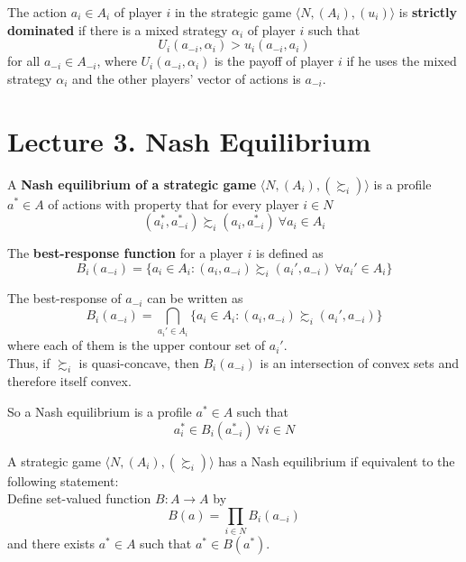 \documentclass[11pt]{article}
\begin{document}
			\begin{definition}[59.2]
				The action $a_i \in A_i$ of player $i$ in the strategic game $\langle N, (A_i), (u_i) \rangle$ is \textbf{strictly dominated} if there is a mixed strategy $\alpha_i$ of player $i$ such that 
				\[
					U_i(a_{-i}, \alpha_i) > u_i(a_{-i}, a_i)
				\]
				for all $a_{-i} \in A_{-i}$, where $U_i(a_{-i}, \alpha_i)$ is the payoff of player $i$ if he uses the mixed strategy $\alpha_i$ and the other players' vector of actions is $a_{-i}$.
			\end{definition}
		
		
	\section{Lecture 3. Nash Equilibrium}
		\begin{definition}[14.1]
			A \textbf{Nash equilibrium of a strategic game} $\langle N, (A_i), (\succsim_i) \rangle$ is a profile $a^* \in A$ of actions with property that for every player $i \in N$
			\[
				(a_i^*, a^*_{-i}) \succsim_i (a_i, a^*_{-i})\ \forall a_i \in A_i
			\]
		\end{definition}
		
		\begin{definition}[pg.15]
			The \textbf{best-response function} for a player $i$ is defined as
			\[
				B_i(a_{-i}) = \{a_i \in A_i : (a_i, a_{-i}) \succsim_i (a_i', a_{-i})\ \forall a_i' \in A_i \}
			\]
		\end{definition}
		
		\begin{remark}
			The best-response of $a_{-i}$ can be written as 
			\[
				B_i(a_{-i}) = \bigcap_{a_i' \in A_i} \{a_i \in A_i : (a_i, a_{-i}) \succsim_i (a_i', a_{-i})\}
			\]
			where each of them is the upper contour set of $a_i'$. \\
			Thus, if $\succsim_i$ is quasi-concave, then $B_i(a_{-i})$ is an intersection of convex sets and therefore itself convex.
		\end{remark}
		
		\begin{remark}[pg.15]
			So a Nash equilibrium is a profile $a^* \in A$ such that
			\[
				a^*_i \in B_i(a^*_{-i})\ \forall i \in N
			\]
		\end{remark}
		
		\begin{lemma}[pg.19]
			A strategic game $\langle N, (A_i), (\succsim_i) \rangle$ has a Nash equilibrium if equivalent to the following statement:\\
			Define set-valued function $B: A \to A$ by 
			\[
				B(a) = \prod_{i\in N} B_i (a_{-i})
			\]
			and there exists $a^* \in A$ such that $a^* \in B(a^*)$.
		\end{lemma}
	
\end{document}

